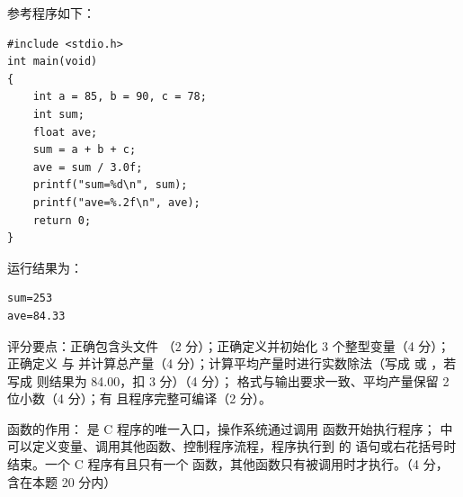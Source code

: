 \documentclass[a4paper,11pt]{article}
\begin{document}

\q 参考程序如下：
\begin{lstlisting}[language={[custom]C}]
#include <stdio.h>
int main(void)
{
    int a = 85, b = 90, c = 78;
    int sum;
    float ave;
    sum = a + b + c;
    ave = sum / 3.0f;
    printf("sum=%d\n", sum);
    printf("ave=%.2f\n", ave);
    return 0;
}
\end{lstlisting}
\begin{analysis}运行结果为：
\begin{lstlisting}
sum=253
ave=84.33
\end{lstlisting}
评分要点：正确包含头文件 （2 分）；正确定义并初始化 3 个整型变量（4 分）；正确定义  与  并计算总产量（4 分）；计算平均产量时进行实数除法（写成  或 ，若写成  则结果为 84.00，扣 3 分）（4 分）； 格式与输出要求一致、平均产量保留 2 位小数（4 分）；有  且程序完整可编译（2 分）。\end{analysis}
\begin{analysis} 函数的作用： 是 C 程序的唯一入口，操作系统通过调用  函数开始执行程序； 中可以定义变量、调用其他函数、控制程序流程，程序执行到  的  语句或右花括号时结束。一个 C 程序有且只有一个  函数，其他函数只有被调用时才执行。（4 分，含在本题 20 分内）\end{analysis}
\end{document}
